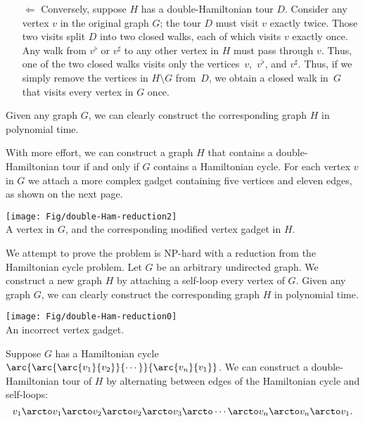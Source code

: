 \documentclass[11pt]{article}
\begin{document}
\begin{enumerate}
\begin{solution}
\begin{itemize}
\item[$\Longleftarrow$]
Conversely, suppose $H$ has a double-Hamiltonian tour $D$.  Consider any vertex $v$ in the original graph $G$; the tour $D$ must visit $v$ exactly twice.  Those two visits split $D$ into two closed walks, each of which visits $v$ exactly once.  Any walk from $v^\flat$ or $v^\sharp$ to any other vertex in $H$ must pass through $v$.  Thus, one of the two closed walks visits only the vertices~$v$,~$v^\flat$, and $v^\sharp$.  Thus, if we simply remove the vertices in $H\setminus G$ from~$D$, we obtain a closed walk in~$G$ that visits every vertex in $G$ once.
\end{itemize}

\noindent
Given any graph $G$, we can clearly construct the corresponding graph $H$ in polynomial time.

\bigskip
With more effort, we can construct a graph $H$ that contains a double-Hamiltonian tour  if and only if $G$ contains a Hamiltonian cycle.  For each vertex $v$ in $G$ we attach a more complex gadget containing five vertices and eleven edges, as shown on the next page.
\end{solution}

\begin{inline}
\texttt{[image: Fig/double-Ham-reduction2]}\\
A vertex in $G$, and the corresponding modified vertex gadget in $H$.
\end{inline}


\bigskip
\begin{nonsolution}
We attempt to prove the problem is {NP}-hard with a reduction from the Hamiltonian cycle problem.  Let $G$ be an arbitrary undirected graph.  We construct a new graph $H$ by attaching a self-loop every vertex of $G$.  Given any graph $G$, we can clearly construct the corresponding graph $H$ in polynomial time.

\begin{inline}
\texttt{[image: Fig/double-Ham-reduction0]}\\
An incorrect vertex gadget.
\end{inline}

Suppose $G$ has a Hamiltonian cycle $\arc{\arc{\arc{v_1}{v_2}}{\cdots}}{\arc{v_n}{v_1}}$.  We can construct a double-Hamiltonian tour of $H$ by alternating between edges of the Hamiltonian cycle and self-loops:
\[
	v_1 \arcto v_1 \arcto v_2 \arcto v_2 \arcto v_3 \arcto \cdots \arcto v_n \arcto v_n \arcto v_1.
\]


\end{nonsolution}
\end{enumerate}
\end{document}
